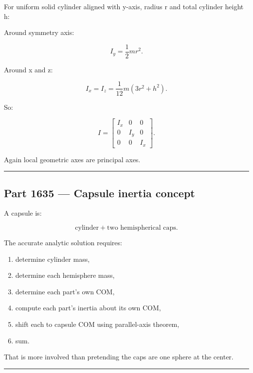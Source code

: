 \hypertarget{06-engine-ii-ch035-part-1634-cylinder-inertia}{}

For uniform solid cylinder aligned with y-axis, radius r and total cylinder height h:

Around symmetry axis:

\[
\boxed{
I_y
=
\frac12mr^2.
}
\]

Around x and z:

\[
\boxed{
I_x=I_z
=
\frac{1}{12}
m(3r^2+h^2).
}
\]

So:

\[
I=
\begin{bmatrix}
I_x&0&0\\
0&I_y&0\\
0&0&I_x
\end{bmatrix}.
\]

Again local geometric axes are principal axes.

\begin{center}\rule{0.5\linewidth}{0.5pt}\end{center}

\subsection{Part 1635 --- Capsule inertia concept}\label{06-engine-ii-ch035-part-1635-capsule-inertia-concept}

\hypertarget{06-engine-ii-ch035-part-1635-capsule-inertia-concept}{}

A capsule is:

\[
\text{cylinder}
+
\text{two hemispherical caps}.
\]

The accurate analytic solution requires:

\begin{enumerate}
\def\labelenumi{\arabic{enumi}.}
\tightlist
\item
  determine cylinder mass,
\item
  determine each hemisphere mass,
\item
  determine each part's own COM,
\item
  compute each part's inertia about its own COM,
\item
  shift each to capsule COM using parallel-axis theorem,
\item
  sum.
\end{enumerate}

That is more involved than pretending the caps are one sphere at the center.

\begin{center}\rule{0.5\linewidth}{0.5pt}\end{center}

